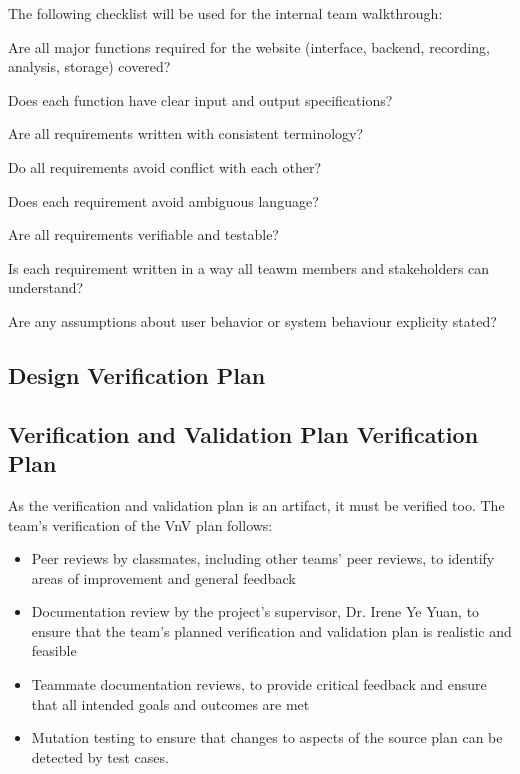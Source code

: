 \documentclass[12pt, titlepage]{article}
\begin{document}
The following checklist will be used for the internal team walkthrough: \\
\begin{todolist}
  \item Are all major functions required for the website (interface, backend, recording, analysis, storage) covered?
  \item Does each function have clear input and output specifications?
  \item Are all requirements written with consistent terminology?
  \item Do all requirements avoid conflict with each other?
  \item Does each requirement avoid ambiguous language?
  \item Are all requirements verifiable and testable?
  \item Is each requirement written in a way all teawm members and stakeholders can understand?
  \item Are any assumptions about user behavior or system behaviour explicity stated?
\end{todolist}

\subsection{Design Verification Plan}




\subsection{Verification and Validation Plan Verification Plan}

As the verification and validation plan is an artifact, it must be verified too. The team's verification of the VnV plan follows:
\begin{itemize}
  \item Peer reviews by classmates, including other teams' peer reviews, to identify areas of improvement and general feedback
  \item Documentation review by the project's supervisor, Dr. Irene Ye Yuan, to ensure that the team's planned verification and validation plan is realistic and feasible
  \item Teammate documentation reviews, to provide critical feedback and ensure that all intended goals and outcomes are met
  \item Mutation testing to ensure that changes to aspects of the source plan can be detected by test cases.
\end{itemize}
\end{document}

